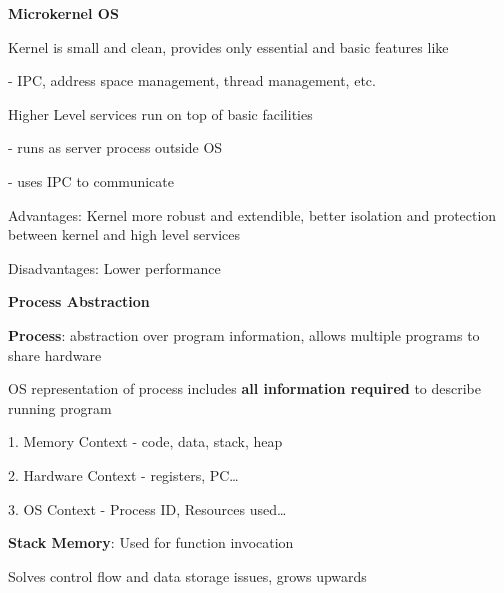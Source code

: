 \documentclass[10pt, a4paper]{article}
\newcommand{\highlight}[1]{{\color{red}\textbf{#1}}}
\newcommand{\red}[1]{{\color{red}#1}}
\newcommand{\green}[1]{{\color{ForestGreen}#1}}
\newcommand{\header}[1]{{\normalsize\textbf{#1}}}
\newcommand{\tab}[0]{\hspace*{2mm}}
\begin{document}
\begin{multicols*}{3}

		\textbf{Microkernel OS}
		
		Kernel is \green{small and clean}, provides only essential and basic features like

		\tab - IPC, address space management, thread management, etc.

		Higher Level services run on top of basic facilities

		- runs as server process outside OS

		- uses IPC to communicate

		\green{Advantages}: Kernel more robust and extendible, better isolation and protection 
		between kernel and high level services

		\red{Disadvantages}: Lower performance











		\header{Process Abstraction}

		\textbf{Process}: abstraction over program information, allows multiple programs to share hardware

		OS representation of process includes \highlight{all information required} to describe running program

		1. Memory Context - code, data, stack, heap

		2. Hardware Context - registers, PC\dots

		3. OS Context - Process ID, Resources used\dots

		\textbf{Stack Memory}: Used for function invocation 
		
		Solves control flow and data storage issues, grows upwards


\end{multicols*}
\end{document}
